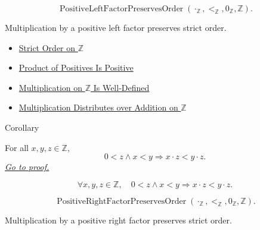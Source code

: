 \begin{remark*}
\[
\operatorname{PositiveLeftFactorPreservesOrder}(\cdot_{\mathbb{Z}},<_{\mathbb{Z}},0_{\mathbb{Z}},\mathbb{Z}).
\]
\end{remark*}

\begin{remark*}[Interpretation]
Multiplication by a positive left factor preserves strict order.
\end{remark*}

\begin{dependencies}
\begin{itemize}
  \item \hyperref[def:strict-order-on-z]{Strict Order on $\mathbb{Z}$}
  \item \hyperref[prop:product-of-positives-is-positive]{Product of Positives Is Positive}
  \item \hyperref[thm:multiplication-on-z-well-defined]{Multiplication on $\mathbb{Z}$ Is Well-Defined}
  \item \hyperref[thm:multiplication-distributes-over-addition-on-z]{Multiplication Distributes over Addition on $\mathbb{Z}$}
\end{itemize}
\end{dependencies}

\begin{corollarybox}{Corollary}
\begin{corollary}
\label{cor:right-positive-multiplication-preserves-strict-order-on-z}
For all $x,y,z\in\mathbb{Z}$,
\[
0<z\land x<y \Longrightarrow x\cdot z<y\cdot z.
\]
\hyperref[prf:right-positive-multiplication-preserves-strict-order-on-z]{\textit{Go to proof.}}
\end{corollary}
\end{corollarybox}

\begin{remark*}
\[
\forall x,y,z\in\mathbb{Z},\quad
0<z\land x<y \Longrightarrow x\cdot z<y\cdot z.
\]
\end{remark*}

\begin{remark*}
\[
\operatorname{PositiveRightFactorPreservesOrder}(\cdot_{\mathbb{Z}},<_{\mathbb{Z}},0_{\mathbb{Z}},\mathbb{Z}).
\]
\end{remark*}

\begin{remark*}[Interpretation]
Multiplication by a positive right factor preserves strict order.
\end{remark*}

